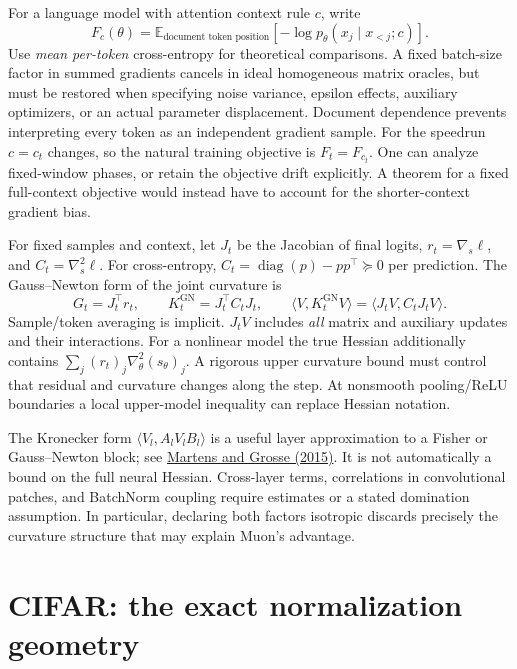 \documentclass[11pt]{article}
\newcommand{\E}{\mathbb E}
\newcommand{\ip}[2]{\langle #1,#2\rangle}
\begin{document}
For a language model with attention context rule $c$, write
\begin{equation}\label{eq:llm-objective}
 F_c(\theta)=\E_{\text{document token position}}
 \left[-\log p_\theta(x_j\mid x_{<j};c)\right].
\end{equation}
Use \emph{mean per-token} cross-entropy for theoretical comparisons. A fixed
batch-size factor in summed gradients cancels in ideal homogeneous matrix
oracles, but must be restored when specifying noise variance, epsilon
effects, auxiliary optimizers, or an actual parameter displacement.
Document dependence prevents interpreting every token as an independent
gradient sample. For the speedrun $c=c_t$ changes, so the natural training
objective is $F_t=F_{c_t}$. One can analyze fixed-window phases, or retain
the objective drift explicitly. A theorem for a fixed full-context objective
would instead have to account for the shorter-context gradient bias.

For fixed samples and context, let $J_t$ be the Jacobian of final logits,
$r_t=\nabla_s\ell$, and $C_t=\nabla_s^2\ell$. For cross-entropy,
$C_t=\operatorname{diag}(p)-pp^\top\succeq0$ per prediction. The
Gauss--Newton form of the joint curvature is
\begin{equation}\label{eq:ggn}
 G_t=J_t^\top r_t,\qquad
 K_t^{\mathrm{GN}}=J_t^\top C_tJ_t,\qquad
 \ip{V}{K_t^{\mathrm{GN}}V}=\ip{J_tV}{C_tJ_tV}.
\end{equation}
Sample/token averaging is implicit. $J_tV$ includes \emph{all} matrix and
auxiliary updates and their interactions. For a nonlinear model the true
Hessian additionally contains
$\sum_j (r_t)_j\nabla_\theta^2(s_\theta)_j$. A rigorous upper curvature
bound must control that residual and curvature changes along the step.
At nonsmooth pooling/ReLU boundaries a local upper-model inequality can
replace Hessian notation.

The Kronecker form
$\ip{V_l}{A_lV_lB_l}$ is a useful layer approximation to a Fisher or
Gauss--Newton block; see
\href{https://proceedings.mlr.press/v37/martens15.html}{Martens and Grosse
(2015)}. It is not automatically a bound on the full neural Hessian.
Cross-layer terms, correlations in convolutional patches, and BatchNorm
coupling require estimates or a stated domination assumption. In particular,
declaring both factors isotropic discards precisely the curvature structure
that may explain Muon's advantage.

\section{CIFAR: the exact normalization geometry}
\end{document}
